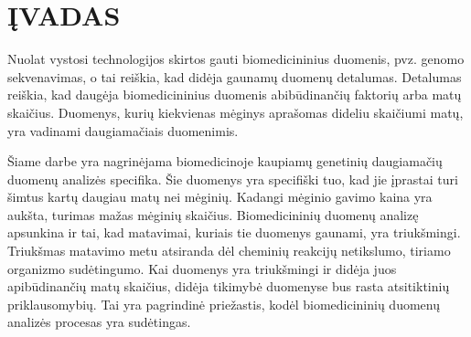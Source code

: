 
\newpage
\section*{ĮVADAS}



Nuolat vystosi technologijos skirtos gauti biomedicininius duomenis, pvz. genomo sekvenavimas\cite{pettersson2009generations}, o tai reiškia, kad didėja gaunamų duomenų detalumas. Detalumas reiškia, kad daugėja biomedicininius duomenis abibūdinančių faktorių arba matų skaičius. Duomenys, kurių kiekvienas mėginys aprašomas dideliu skaičiumi matų, yra vadinami daugiamačiais duomenimis.

Šiame darbe yra nagrinėjama biomedicinoje kaupiamų genetinių daugiamačių duomenų analizės specifika. Šie duomenys yra specifiški tuo, kad jie įprastai turi šimtus kartų daugiau matų nei mėginių. Kadangi mėginio gavimo kaina yra aukšta, turimas mažas mėginių skaičius. Biomedicininių duomenų analizę apsunkina ir tai, kad matavimai, kuriais tie duomenys gaunami, yra triukšmingi. Triukšmas matavimo metu atsiranda dėl cheminių reakcijų netikslumo, tiriamo organizmo sudėtingumo. Kai duomenys yra triukšmingi ir didėja juos apibūdinančių matų skaičius, didėja tikimybė duomenyse bus rasta atsitiktinių priklausomybių. Tai yra pagrindinė priežastis, kodėl biomedicininių duomenų analizės procesas yra sudėtingas.



